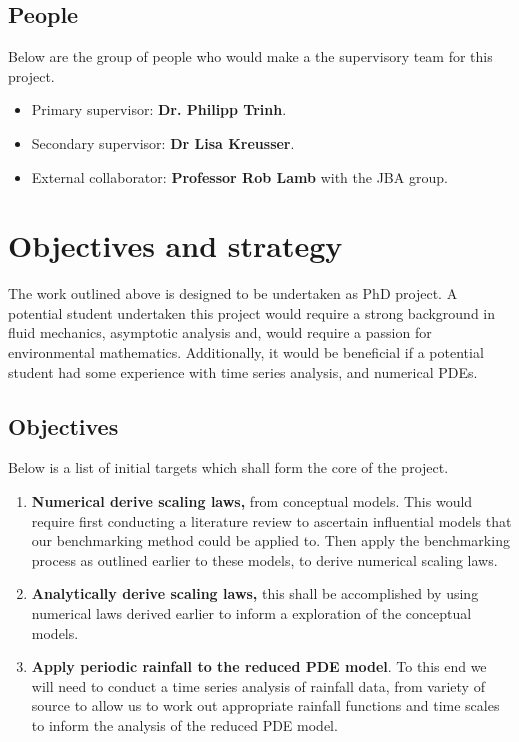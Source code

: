 \documentclass[11pt]{article}
\begin{document}
\vspace{5pt}
\subsection{People}
Below are the group of people who would make a the supervisory team for this project.
\begin{itemize}
    \item Primary supervisor: \textbf{Dr. Philipp Trinh}.
    \item Secondary supervisor: \textbf{Dr Lisa Kreusser}.
    \item External collaborator: \textbf{Professor Rob Lamb} with the JBA group.
\end{itemize}



\section{Objectives and strategy}

The work outlined above is designed to be undertaken as PhD project. A potential student undertaken this project would require a strong background in fluid mechanics, asymptotic analysis and, would require a passion for environmental mathematics. 
Additionally, it would be beneficial if a potential student had some experience with time series analysis, and numerical PDEs.

\subsection{Objectives}
Below is a list of initial targets which shall form the core of the project.

\begin{enumerate}
    \item \textbf{Numerical derive scaling laws,} from conceptual models. This would require first conducting a literature review to ascertain influential models that our benchmarking method could be applied to. Then apply the benchmarking process as outlined earlier to these models, to derive numerical scaling laws.
    \item \textbf{Analytically derive scaling laws,} this shall be accomplished by using numerical laws derived earlier to inform a exploration of the conceptual models.
    \item \textbf{Apply periodic rainfall to the reduced PDE model}. To this end we will need to conduct a time series analysis of rainfall data, from variety of source to allow us to work out appropriate rainfall functions and time scales to inform the analysis of the reduced PDE model.
\end{enumerate}
\end{document}
